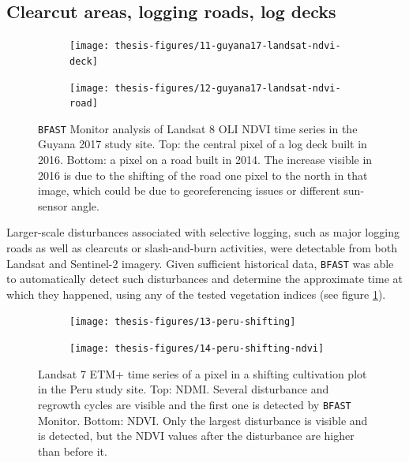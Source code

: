 \documentclass[a4paper,12pt]{scrbook}
\begin{document}
\subsection{Clearcut areas, logging roads, log decks}

\begin{figure}
  \begin{subfigure}{\textwidth}
    \centering
    \texttt{[image: thesis-figures/11-guyana17-landsat-ndvi-deck]}
  \end{subfigure}
  \begin{subfigure}{\textwidth}
    \centering
    \texttt{[image: thesis-figures/12-guyana17-landsat-ndvi-road]}
  \end{subfigure}
  \caption{\texttt{BFAST} Monitor analysis of Landsat 8 \ac{OLI} \ac{NDVI} time series in the Guyana 2017 study site. Top: the central pixel of a log deck built in 2016. Bottom: a pixel on a road built in 2014. The increase visible in 2016 is due to the shifting of the road one pixel to the north in that image, which could be due to georeferencing issues or different sun-sensor angle.}
  \label{fig-guyana17-landsat-ndvi-deck}
\end{figure}

Larger-scale disturbances associated with selective logging, such as major logging roads as well as clearcuts or slash-and-burn activities, were detectable from both Landsat and Sentinel-2 imagery. Given sufficient historical data, \texttt{BFAST} was able to automatically detect such disturbances and determine the approximate time at which they happened, using any of the tested vegetation indices (see figure \ref{fig-guyana17-landsat-ndvi-deck}).

\begin{figure}
  \begin{subfigure}{\textwidth}
    \centering
    \texttt{[image: thesis-figures/13-peru-shifting]}
  \end{subfigure}
  \begin{subfigure}{\textwidth}
    \centering
    \texttt{[image: thesis-figures/14-peru-shifting-ndvi]}
  \end{subfigure}
  \caption{Landsat 7 \ac{ETM+} time series of a pixel in a shifting cultivation plot in the Peru study site. Top: \ac{NDMI}. Several disturbance and regrowth cycles are visible and the first one is detected by \texttt{BFAST} Monitor. Bottom: \ac{NDVI}. Only the largest disturbance is visible and is detected, but the \ac{NDVI} values after the disturbance are higher than before it.}
  \label{fig-peru-shifting-cultivation}
\end{figure}
\end{document}

